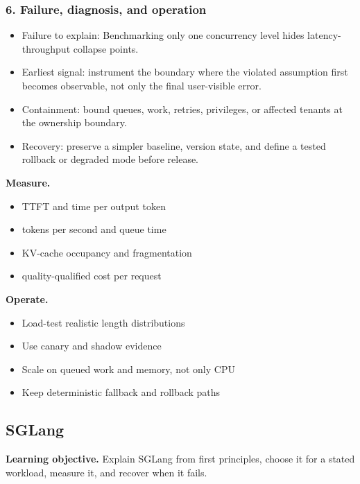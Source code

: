 \subsubsection*{6. Failure, diagnosis, and operation}
\begin{itemize}
\item Failure to explain: Benchmarking only one concurrency level hides latency-throughput collapse points.
\item Earliest signal: instrument the boundary where the violated assumption first becomes observable, not only the final user-visible error.
\item Containment: bound queues, work, retries, privileges, or affected tenants at the ownership boundary.
\item Recovery: preserve a simpler baseline, version state, and define a tested rollback or degraded mode before release.
\end{itemize}
\textbf{Measure.}\begin{itemize}
\item TTFT and time per output token
\item tokens per second and queue time
\item KV-cache occupancy and fragmentation
\item quality-qualified cost per request
\end{itemize}
\textbf{Operate.}\begin{itemize}
\item Load-test realistic length distributions
\item Use canary and shadow evidence
\item Scale on queued work and memory, not only CPU
\item Keep deterministic fallback and rollback paths
\end{itemize}
\subsection{SGLang}
\textbf{Learning objective.} Explain SGLang from first principles, choose it for a stated workload, measure it, and recover when it fails.
